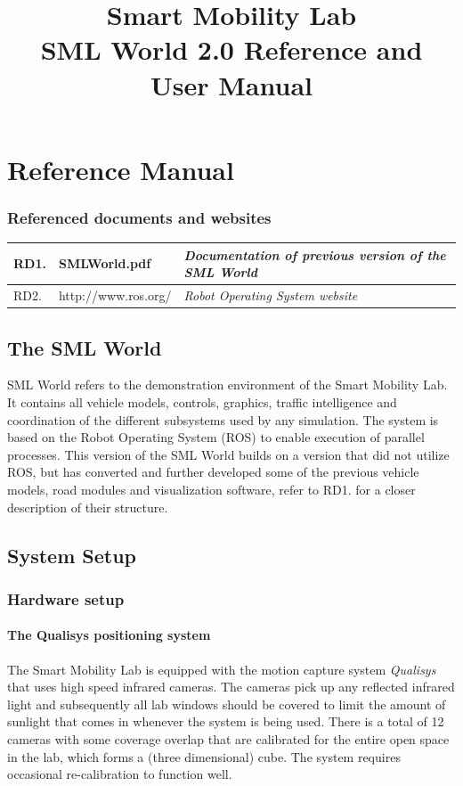 \documentclass[11pt,a4paper]{book}
\begin{document}
\title{Smart Mobility Lab \\
SML World 2.0 Reference and User Manual}

\maketitle

\tableofcontents

\part{Reference Manual}


\section{Referenced documents and websites}
\begin{tabular}{| l | l | p{80mm} |}
\hline
RD1. & SMLWorld.pdf & \textit{Documentation of previous version of the SML World} \\
\hline
RD2. & http://www.ros.org/ & \textit{Robot Operating System website} \\
\hline
\end{tabular}


\chapter{The SML World}
SML World refers to the demonstration environment of the Smart Mobility Lab. It contains all vehicle models, controls, graphics, traffic intelligence and coordination of the different subsystems used by any simulation. The system is based on the Robot Operating System (ROS) to enable execution of parallel processes. This version of the SML World builds on a version that did not utilize ROS, but has converted and further developed some of the previous vehicle models, road modules and visualization software, refer to RD1. for a closer description of their structure.

\chapter{System Setup}
\section{Hardware setup}
\subsection{The Qualisys positioning system}
The Smart Mobility Lab is equipped with the motion capture system \textit{Qualisys} that uses high speed infrared cameras. The cameras pick up any reflected infrared light and subsequently all lab windows should be covered to limit the amount of sunlight that comes in whenever the system is being used. There is a total of 12 cameras with some coverage overlap that are calibrated for the entire open space in the lab, which forms a (three dimensional) cube. The system requires occasional re-calibration to function well.
\end{document}
